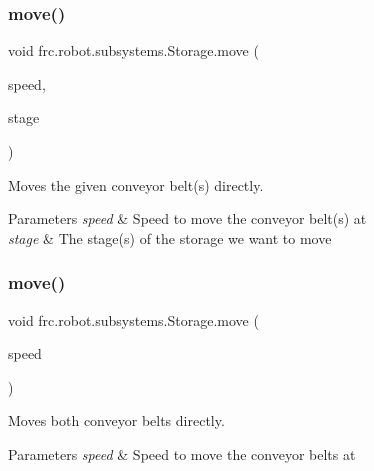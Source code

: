 \subsubsection{\texorpdfstring{move()}{move()}\hspace{0.1cm}{\footnotesize\ttfamily [1/2]}}
{\footnotesize\ttfamily void frc.\+robot.\+subsystems.\+Storage.\+move (\begin{DoxyParamCaption}\item[{double}]{speed,  }\item[{\mbox{\hyperlink{enumfrc_1_1robot_1_1enums_1_1_storage_stage}{Storage\+Stage}}}]{stage }\end{DoxyParamCaption})\hspace{0.3cm}{\ttfamily [inline]}}



Moves the given conveyor belt(s) directly. 


\begin{DoxyParams}{Parameters}
{\em speed} & Speed to move the conveyor belt(s) at \\
\hline
{\em stage} & The stage(s) of the storage we want to move \\
\hline
\end{DoxyParams}
\mbox{\label{classfrc_1_1robot_1_1subsystems_1_1_storage_a8fc7f7a8fde529b740a07c606eff02f1}} 
\subsubsection{\texorpdfstring{move()}{move()}\hspace{0.1cm}{\footnotesize\ttfamily [2/2]}}
{\footnotesize\ttfamily void frc.\+robot.\+subsystems.\+Storage.\+move (\begin{DoxyParamCaption}\item[{double}]{speed }\end{DoxyParamCaption})\hspace{0.3cm}{\ttfamily [inline]}}



Moves both conveyor belts directly. 


\begin{DoxyParams}{Parameters}
{\em speed} & Speed to move the conveyor belts at \\
\hline
\end{DoxyParams}
\mbox{\label{classfrc_1_1robot_1_1subsystems_1_1_storage_adb0d9bf991755392eac51b8b723b30e2}} 
